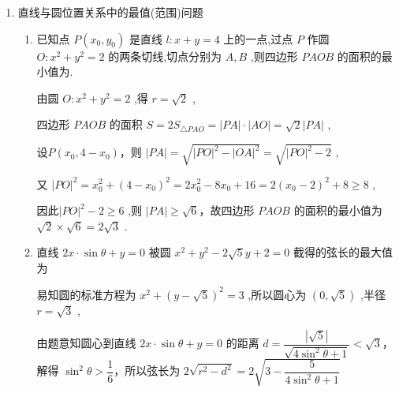 \begin{enumerate}
\begin{enumerate}
\begin{jieda}
            设反射光线所在直线的斜率为 $k$ ,则反射光线所在直线的方程为 $y + 3 = k\left( {x - 2}\right)$ ,即 ${kx} - y - {2k} - 3 = 0$ . 由反射光线与圆相切,得 $\dfrac{\left| -3k - 2 - 2k - 3\right| }{\sqrt{{k}^{2} + 1}} = 1$ ,解得 $k =  - \dfrac{4}{3}$ 或 $k =  - \dfrac{3}{4}$ .
        \end{jieda}
        
    \end{enumerate}
    \item 直线与圆位置关系中的最值(范围)问题
    \begin{enumerate}
        \item 已知点 $P\left( {{x}_{0},{y}_{0}}\right)$ 是直线 $l : x + y = 4$ 上的一点,过点 $P$ 作圆 $O : {x}^{2} + {y}^{2} = 2$ 的两条切线,切点分别为 $A,B$ ,则四边形 ${PAOB}$ 的面积的最小值为.

        \begin{jieda}
            由圆 $O : {x}^{2} + {y}^{2} = 2$ ,得 $r = \sqrt{2}$ ,
            
            四边形 ${PAOB}$ 的面积 $S = 2{S}_{\bigtriangleup {PAO}} = \left| {PA}\right|  \cdot  \left| {AO}\right|  = \sqrt{2}\left| {PA}\right|$ ,
            
            设$P\left( {{x}_{0},4 - {x}_{0}}\right)$，则 $\left| {PA}\right|  = \sqrt{{\left| PO\right| }^{2} - {\left| OA\right| }^{2}} = \sqrt{{\left| PO\right| }^{2} - 2}$ ,
            
            又 ${\left| PO\right| }^{2} = {x}_{0}^{2} + {\left( 4 - {x}_{0}\right) }^{2} = 2{x}_{0}^{2} - 8{x}_{0} + {16} = 2{\left( {x}_{0} - 2\right) }^{2} + 8 \geq  8$ ,
            
            因此${\left| PO\right| }^{2} - 2 \geq  6$ ,则 $\left| {PA}\right|  \geq  \sqrt{6}$，故四边形 ${PAOB}$ 的面积的最小值为 $\sqrt{2} \times  \sqrt{6} = 2\sqrt{3}$ .
        \end{jieda}
        \item 直线 ${2x} \cdot  \sin \theta  + y = 0$ 被圆 ${x}^{2} + {y}^{2} - 2\sqrt{5}y + 2 = 0$ 截得的弦长的最大值为
        \begin{jieda}
            易知圆的标准方程为 ${x}^{2} + {\left( y - \sqrt{5}\right) }^{2} = 3$ ,所以圆心为 $\left( {0,\sqrt{5}}\right)$ ,半径 $r = \sqrt{3}$ ,
            
            由题意知圆心到直线 ${2x} \cdot  \sin \theta  + y = 0$ 的距离 $d = \dfrac{\left| \sqrt{5}\right| }{\sqrt{4{\sin }^{2}\theta  + 1}} < \sqrt{3}$，解得 ${\sin }^{2}\theta  > \dfrac{1}{6}$，所以弦长为 $2\sqrt{{r}^{2} - {d}^{2}} = 2\sqrt{3 - \dfrac{5}{4{\sin }^{2}\theta  + 1}}$ 
            

\end{jieda}
\end{enumerate}
\end{enumerate}
